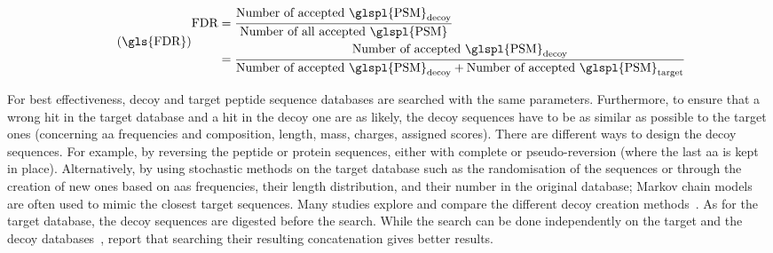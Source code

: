 \begin{equation}\label{eq:fdr-prot}
    \tag{\gls{FDR}}
    \begin{split}
        {\text{FDR}} & =\frac{\text{Number of accepted \glspl{PSM}}_{\text{decoy}}}%
    {\text{Number of all accepted \glspl{PSM}}}\\
          & =\frac{\text{Number of accepted \glspl{PSM}}_{\text{decoy}}}%
    {\text{Number of accepted \glspl{PSM}}_{\text{decoy}}+\text{Number of accepted \glspl{PSM}}_{\text{target}}}
\end{split}
\raisetag{4\normalbaselineskip}
\end{equation}
\begin{comment}
\vspace{-6mm}
where:
{\small
\begin{itemize}[topsep=0pt,nosep]
    \item $\text{\emph{Number of accepted \glspl{PSM}}}_{\text{decoy}}$
is the number of \glspl{PSM} from decoy sequences
that are above a specified threshold $\mathcal{t}$,
    \item $\text{\emph{Number of all accepted \glspl{PSM}}}$
is the total number of accepted \glspl{PSM}
above the specified threshold $\mathcal{t}$,
including the accepted decoy \glspl{PSM}.
    \item $\text{\emph{Number of accepted \glspl{PSM}}}_{\text{target}}$
is the number of accepted \glspl{PSM} above the specified threshold $\mathcal{t}$.
\end{itemize}
}
\end{comment}

\vspace{-4mm}
For best effectiveness,
decoy and target peptide sequence databases are searched with the same parameters.
Furthermore, to ensure that
a wrong hit in the target database and a hit in the decoy one are as likely,
the decoy sequences have to be as similar as possible to the target ones
(concerning \gls{aa} frequencies and composition,
length, mass, charges, assigned scores).
There are different ways to design the decoy sequences.
For example, by reversing the peptide or protein sequences,
either with complete or pseudo-reversion (where the last \gls{aa} is kept in place).
Alternatively, by using stochastic methods on the target database
such as the randomisation of the sequences or
through the creation of new ones based on \glspl{aa} frequencies,
their length distribution,
and their number in the original database;
Markov chain models~ are often used
to mimic the closest target sequences.
Many studies explore and compare the different decoy creation
methods~.
As for the target database,
the decoy sequences are digested  before the search.
While the search can be done independently
on the target and the decoy databases~,
\citet*{Elias2007-wi} report that
searching their resulting concatenation gives better results.\mybr\

